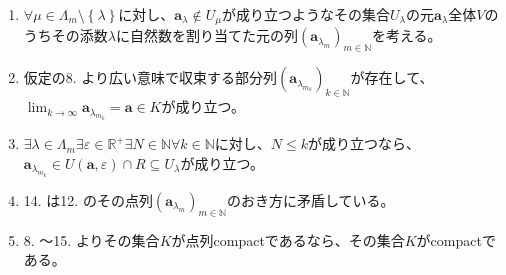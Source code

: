 \documentclass[dvipdfmx]{jsarticle}
\begin{document}
\begin{enumerate}
\item
  $\forall\mu \in \varLambda_{m} \setminus \left\{ \lambda \right\}$に対し、$\mathbf{a}_{\lambda} \notin U_{\mu}$が成り立つようなその集合$U_{\lambda}$の元$\mathbf{a}_{\lambda}$全体$V$のうちその添数$\lambda$に自然数を割り当てた元の列$\left( \mathbf{a}_{\lambda_{m}} \right)_{m \in \mathbb{N}}$を考える。
\item
  仮定の8. より広い意味で収束する部分列$\left( \mathbf{a}_{\lambda_{m_{k}}} \right)_{k \in \mathbb{N}}$が存在して、$\lim_{k \rightarrow \infty}\mathbf{a}_{\lambda_{m_{k}}} = \mathbf{a} \in K$が成り立つ。
\item
  $\exists\lambda \in \varLambda_{m}\exists\varepsilon \in \mathbb{R}^{+}\exists N \in \mathbb{N}\forall k \in \mathbb{N}$に対し、$N \leq k$が成り立つなら、$\mathbf{a}_{\lambda_{m_{k}}} \in U\left( \mathbf{a},\varepsilon \right) \cap R \subseteq U_{\lambda}$が成り立つ。
\item
  14. は12. のその点列$\left( \mathbf{a}_{\lambda_{m}} \right)_{m \in \mathbb{N}}$のおき方に矛盾している。
\item
  8. ～15. よりその集合$K$が点列compactであるなら、その集合$K$がcompactである。
\end{enumerate}
\end{document}
